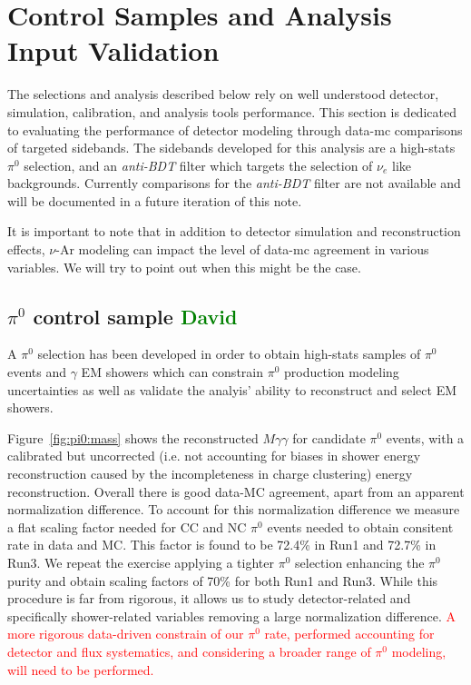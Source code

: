 \documentclass[a4paper]{article}
\begin{document}
\newpage

\section{Control Samples and Analysis Input Validation}
\par The selections and analysis described below rely on well understood detector, simulation, calibration, and analysis tools performance. This section is dedicated to evaluating the performance of detector modeling through data-mc comparisons of targeted sidebands. The sidebands developed for this analysis are a high-stats $\pi^0$ selection, and an \emph{anti-BDT} filter which targets the selection of $\nu_e$ like backgrounds. Currently comparisons for the \emph{anti-BDT} filter are not available and will be documented in a future iteration of this note.
\par It is important to note that in addition to detector simulation and reconstruction effects, $\nu$-Ar modeling can impact the level of data-mc agreement in various variables. We will try to point out when this might be the case.
\subsection{$\pi^0$ control sample \textcolor{green}{David}}
\par A $\pi^0$ selection has been developed in order to obtain high-stats samples of $\pi^0$ events and $\gamma$ EM showers which can constrain $\pi^0$ production modeling uncertainties as well as validate the analyis' ability to reconstruct and select EM showers.
\par Figure~\ref{fig:pi0:mass} shows the reconstructed $M\gamma\gamma$ for candidate $\pi^0$ events, with a calibrated but uncorrected (i.e. not accounting for biases in shower energy reconstruction caused by the incompleteness in charge clustering) energy reconstruction. Overall there is good data-MC agreement, apart from an apparent normalization difference. To account for this normalization difference we measure a flat scaling factor needed for CC and NC $\pi^0$ events needed to obtain  consitent rate in data and MC. This factor is found to be 72.4\% in Run1 and 72.7\% in Run3. We repeat the exercise applying a tighter $\pi^0$ selection enhancing the $\pi^0$ purity and obtain scaling factors of 70\% for both Run1 and Run3. While this procedure is far from rigorous, it allows us to study detector-related and specifically shower-related variables removing a large normalization difference. \textcolor{red}{A more rigorous data-driven constrain of our $\pi^0$ rate, performed accounting for detector and flux systematics, and considering a broader range of $\pi^0$ modeling, will need to be performed.}
\end{document}
